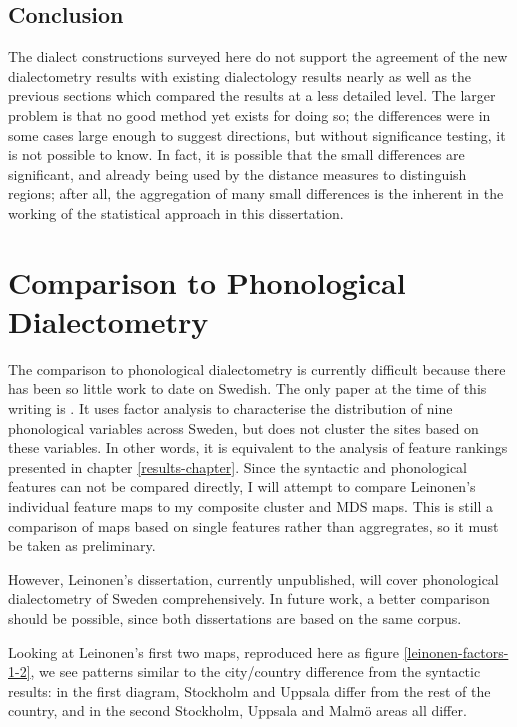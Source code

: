 \subsection{Conclusion}

The dialect constructions surveyed here do not support the agreement
of the new dialectometry results with existing dialectology results
nearly as well as the previous sections which compared the results at
a less detailed level. The larger problem is that no good method yet
exists for doing so; the differences were in some cases large enough
to suggest directions, but without significance testing, it is not
possible to know. In fact, it is possible that the small differences
are significant, and already being used by the distance measures to
distinguish regions; after all, the aggregation of many small
differences is the inherent in the working of the statistical approach
in this dissertation.

\section{Comparison to Phonological Dialectometry}

The comparison to phonological dialectometry is currently difficult
because there has been so little work to date on Swedish. The only
paper at the time of this writing is . It uses
factor analysis to characterise the distribution of nine phonological
variables across Sweden, but does not cluster the sites based on these
variables. In other words, it is equivalent to the analysis of feature
rankings presented in chapter \ref{results-chapter}. Since the
syntactic and phonological features can not be compared directly, I will
attempt to compare Leinonen's individual feature maps to my composite
cluster and MDS maps. This is still a comparison of maps based on
single features rather than aggregrates, so it must be taken as
preliminary.

However, Leinonen's dissertation, currently unpublished, will cover
phonological dialectometry of Sweden comprehensively. In future work,
a better comparison should be possible, since both dissertations are
based on the same corpus.

Looking at Leinonen's first two maps, reproduced here as figure
\ref{leinonen-factors-1-2}, we see patterns similar to the
city/country difference from the syntactic results: in the first diagram,
Stockholm and Uppsala differ from the rest of the country, and in the
second Stockholm, Uppsala and Malm\"o areas all differ.

